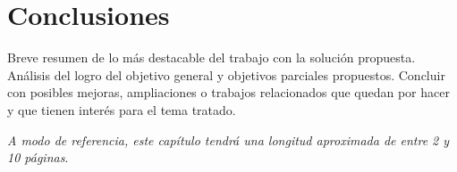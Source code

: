 \chapter{Conclusiones}
\label{chap:conclusiones}

\noindent
Breve resumen de lo más destacable del trabajo con la solución propuesta. Análisis
del logro del objetivo general y objetivos parciales propuestos. Concluir con
posibles mejoras, ampliaciones o trabajos relacionados que quedan por hacer y
que tienen interés para el tema tratado.

\emph{A modo de referencia, este capítulo tendrá una longitud aproximada de
  entre 2 y 10 páginas}.
